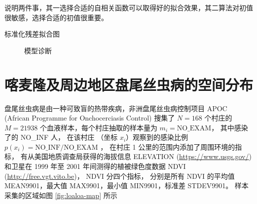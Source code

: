 \documentclass[12pt,a4paper,UTF8,twoside]{book}
\theoremstyle{definition}
\theoremstyle{definition}
\theoremstyle{definition}
\theoremstyle{remark}
\begin{document}
说明两件事，其一选择合适的自相关函数可以取得好的拟合效果，其二算法对初值很敏感，选择合适的初值很重要。

标准化残差拟合图

\begin{figure}

{\centering {}

}

\caption{模型诊断}\label{fig:model-check}
\end{figure}

\hypertarget{loaloa}{%
\section{喀麦隆及周边地区盘尾丝虫病的空间分布}\label{loaloa}}

盘尾丝虫病是由一种可致盲的热带疾病，非洲盘尾丝虫病控制项目 APOC (African
Programme for Onchocerciasis Control) 搜集了 \(N=168\) 个村庄的
\(M = 21938\) 个血液样本，每个村庄抽取的样本量为
\(m_i=\mathrm{NO\_EXAM}\)， 其中感染了的 NO\_INF 人， 在该村庄 （坐标
\(x_i\)）观察到的感染比例 \(p(x_i) = \mathrm{NO\_INF/NO\_EXAM}\) ，
在村庄 1 公里的范围内添加了周围环境的指标，
有从美国地质调查局获得的海拔信息 ELEVATION (\url{https://www.usgs.gov/})
和卫星在 1999 年至 2001 年间测得的植被绿色度数据 NDVI
(\url{http://free.vgt.vito.be})， NDVI 分四个指标， 分别是所有 NDVI
的平均值 MEAN9901，最大值 MAX9901，最小值 MIN9901，标准差 STDEV9901。
样本采集的区域如图 \ref{fig:loaloa-map} 所示
\end{document}
